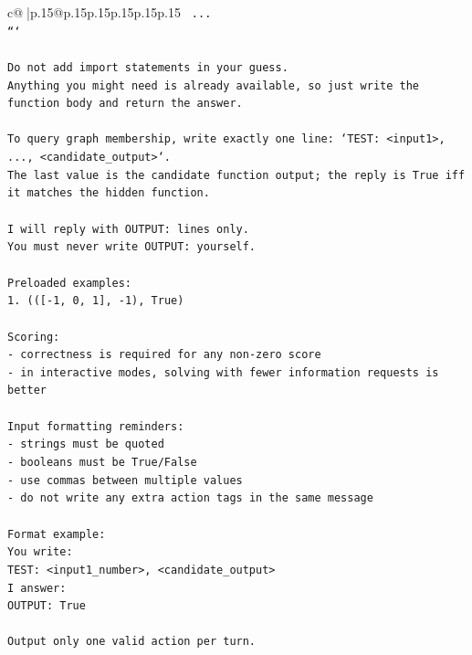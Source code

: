 \documentclass{article}
\begin{document}
{\begin{supertabular}{c@{$\;$}|p{.15\linewidth}@{}p{.15\linewidth}p{.15\linewidth}p{.15\linewidth}p{.15\linewidth}p{.15\linewidth}}
{{{\texttt{    ...} \\
\texttt{```} \\
\\ 
\texttt{Do not add import statements in your guess.} \\
\texttt{Anything you might need is already available, so just write the function body and return the answer.} \\
\\ 
\texttt{To query graph membership, write exactly one line: `TEST: <input1>, ..., <candidate\_output>`.} \\
\texttt{The last value is the candidate function output; the reply is True iff it matches the hidden function.} \\
\\ 
\texttt{I will reply with OUTPUT: lines only.} \\
\texttt{You must never write OUTPUT: yourself.} \\
\\ 
\texttt{Preloaded examples:} \\
\texttt{1. (({[}{-}1, 0, 1{]}, {-}1), True)} \\
\\ 
\texttt{Scoring:} \\
\texttt{{-} correctness is required for any non{-}zero score} \\
\texttt{{-} in interactive modes, solving with fewer information requests is better} \\
\\ 
\texttt{Input formatting reminders:} \\
\texttt{{-} strings must be quoted} \\
\texttt{{-} booleans must be True/False} \\
\texttt{{-} use commas between multiple values} \\
\texttt{{-} do not write any extra action tags in the same message} \\
\\ 
\texttt{Format example:} \\
\texttt{You write:} \\
\texttt{TEST: <input1\_number>, <candidate\_output>} \\
\texttt{I answer:} \\
\texttt{OUTPUT: True} \\
\\ 
\texttt{Output only one valid action per turn.} \\
            }
        }
    }
     \\ \\


\end{supertabular}}
\end{document}
